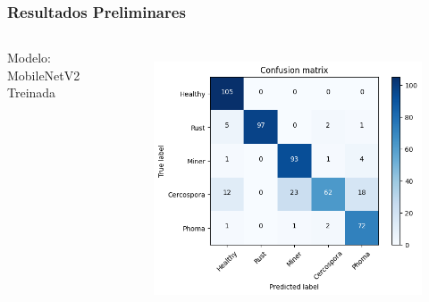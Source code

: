\documentclass[aspectratio=169]{beamer}
\begin{document}
\begin{frame}
    \frametitle{Resultados Preliminares}

    \centering


    \begin{columns}



        \centering
        \tiny Modelo: MobileNetV2 Treinada
        \begin{figure}
            \centering
            \includegraphics[scale=0.39]{img/MobilenetResult1.png}
            \label{fig:enter-label}
        \end{figure}
        \centering




\end{columns}
\end{frame}
\end{document}
